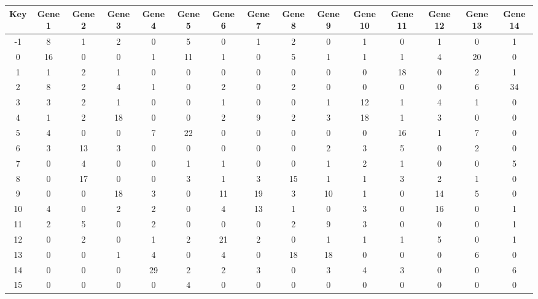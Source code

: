 \begin{tabular}{|c|c|c|c|c|c|c|c|c|c|c|c|c|c|c|}
\hline
Key & Gene 1 & Gene 2 & Gene 3 & Gene 4 & Gene 5 & Gene 6 & Gene 7 & Gene 8 & Gene 9 & Gene 10 & Gene 11 & Gene 12 & Gene 13 & Gene 14 \\
\hline
-1 & 8 & 1 & 2 & 0 & 5 & 0 & 1 & 2 & 0 & 1 & 0 & 1 & 0 & 1 \\
0 & 16 & 0 & 0 & 1 & 11 & 1 & 0 & 5 & 1 & 1 & 1 & 4 & 20 & 0 \\
1 & 1 & 2 & 1 & 0 & 0 & 0 & 0 & 0 & 0 & 0 & 18 & 0 & 2 & 1 \\
2 & 8 & 2 & 4 & 1 & 0 & 2 & 0 & 2 & 0 & 0 & 0 & 0 & 6 & 34 \\
3 & 3 & 2 & 1 & 0 & 0 & 1 & 0 & 0 & 1 & 12 & 1 & 4 & 1 & 0 \\
4 & 1 & 2 & 18 & 0 & 0 & 2 & 9 & 2 & 3 & 18 & 1 & 3 & 0 & 0 \\
5 & 4 & 0 & 0 & 7 & 22 & 0 & 0 & 0 & 0 & 0 & 16 & 1 & 7 & 0 \\
6 & 3 & 13 & 3 & 0 & 0 & 0 & 0 & 0 & 2 & 3 & 5 & 0 & 2 & 0 \\
7 & 0 & 4 & 0 & 0 & 1 & 1 & 0 & 0 & 1 & 2 & 1 & 0 & 0 & 5 \\
8 & 0 & 17 & 0 & 0 & 3 & 1 & 3 & 15 & 1 & 1 & 3 & 2 & 1 & 0 \\
9 & 0 & 0 & 18 & 3 & 0 & 11 & 19 & 3 & 10 & 1 & 0 & 14 & 5 & 0 \\
10 & 4 & 0 & 2 & 2 & 0 & 4 & 13 & 1 & 0 & 3 & 0 & 16 & 0 & 1 \\
11 & 2 & 5 & 0 & 2 & 0 & 0 & 0 & 2 & 9 & 3 & 0 & 0 & 0 & 1 \\
12 & 0 & 2 & 0 & 1 & 2 & 21 & 2 & 0 & 1 & 1 & 1 & 5 & 0 & 1 \\
13 & 0 & 0 & 1 & 4 & 0 & 4 & 0 & 18 & 18 & 0 & 0 & 0 & 6 & 0 \\
14 & 0 & 0 & 0 & 29 & 2 & 2 & 3 & 0 & 3 & 4 & 3 & 0 & 0 & 6 \\
15 & 0 & 0 & 0 & 0 & 4 & 0 & 0 & 0 & 0 & 0 & 0 & 0 & 0 & 0 \\
\hline
\end{tabular}